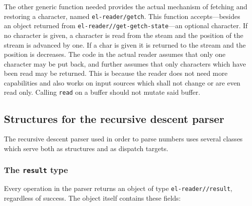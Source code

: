 \documentclass[a4paper,10pt,twoside]{report}
\newcommand{\sym}[1]{\texttt{#1}}
\newcommand{\fun}[1]{\texttt{#1}}
\newcommand{\Read}{\fun{read}}
\begin{document}
The other generic function needed provides the actual mechanism of fetching and
restoring a character, named \fun{el-reader/getch}.  This function
accepts---besides an object returned from \fun{el-reader//get-getch-state}---an
optional character.  If no character is given, a character is read from the
steam and the position of the stream is advanced by one.  If a char is given it
is returned to the stream and the position is decreases.  The code in the actual
reader assumes that only one character may be put back, and further assumes that
only characters which have been read may be returned.  This is because the
reader does not need more capabilities and also works on input sources which
shall not change or are even read only.  Calling \Read{} on a buffer should not
mutate said buffer.

\subsection{Structures for the recursive descent parser}
\label{subsec:parser-structs}

The recursive descent parser used in order to parse numbers uses several classes
which serve both as structures and as dispatch targets.

\subsubsection{The \sym{result} type}
\label{subsubsec:result}

Every operation in the parser returns an object of type \fun{el-reader//result},
regardless of success.  The object itself contains these fields:
\end{document}
